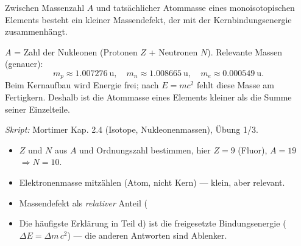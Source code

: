 

Zwischen Massenzahl $A$ und tatsächlicher Atommasse eines monoisotopischen
Elements besteht ein kleiner Massendefekt, der mit der Kernbindungsenergie
zusammenhängt.

\begin{werkzeugkasten}
$A$ = Zahl der Nukleonen (Protonen $Z$ + Neutronen $N$). Relevante Massen
(genauer):
\begin{equation}
  m_p\approx 1.007276\ \mathrm{u},\quad
  m_n\approx 1.008665\ \mathrm{u},\quad
  m_e\approx 0.000549\ \mathrm{u}.
\end{equation}
Beim Kernaufbau wird Energie frei; nach $E=mc^2$ fehlt diese Masse am
Fertigkern. Deshalb ist die Atommasse eines Elements kleiner als die Summe
seiner Einzelteile.

\textit{Skript:} Mortimer Kap. 2.4 (Isotope, Nukleonenmassen), Übung 1/3.
\end{werkzeugkasten}

\begin{achtung}
\begin{itemize}
  \item $Z$ und $N$ aus $A$ und Ordnungszahl bestimmen, hier $Z=9$ (Fluor),
        $A=19$ $\Rightarrow N=10$.
  \item Elektronenmasse mitzählen (Atom, nicht Kern) --- klein, aber relevant.
  \item Massendefekt als \emph{relativer} Anteil (%
  \item Die häufigste Erklärung in Teil d) ist die freigesetzte
        Bindungsenergie ($\Delta E=\Delta m\,c^2$) --- die anderen Antworten
        sind Ablenker.
\end{itemize}
\end{achtung}
